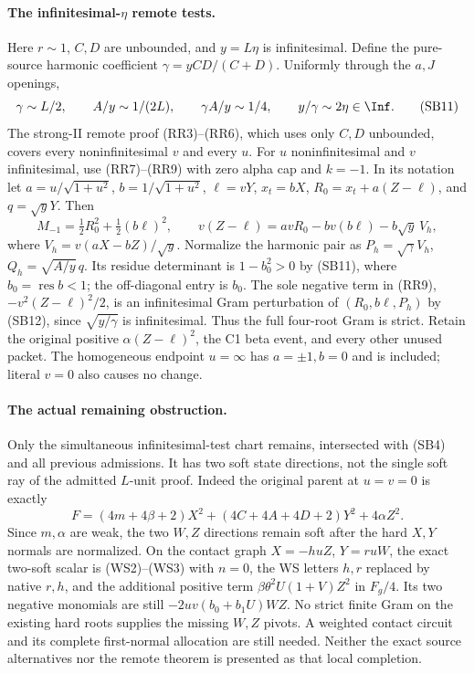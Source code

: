 \paragraph{The infinitesimal-$\eta$ remote tests.}
Here $r\sim1$, $C,D$ are unbounded, and $y=L\eta$ is infinitesimal.
Define the pure-source harmonic coefficient
$\gamma=yCD/(C+D)$. Uniformly through the $a,J$ openings,
\[
 \gamma\sim L/2,\qquad A/y\sim1/(2L),\qquad
 \gamma A/y\sim1/4,\qquad y/\gamma\sim2\eta\in\Inf. \tag{SB11}
\]
The strong-II remote proof (RR3)--(RR6), which uses only $C,D$
unbounded, covers every noninfinitesimal $v$ and every $u$.
For $u$ noninfinitesimal and $v$ infinitesimal, use (RR7)--(RR9)
with zero alpha cap and $k=-1$. In its notation let
$a=u/\sqrt{1+u^2}$, $b=1/\sqrt{1+u^2}$,
$\ell=vY$, $x_t=bX$, $R_0=x_t+a(Z-\ell)$, and $q=\sqrt yY$.
Then
\[
 M_{-1}=\tfrac12R_0^2+\tfrac12(b\ell)^2,\qquad
 v(Z-\ell)=avR_0-bv(b\ell)-b\sqrt y\,V_h,       \tag{SB12}
\]
where $V_h=v(aX-bZ)/\sqrt y$. Normalize the harmonic pair as
$P_h=\sqrt\gamma V_h$, $Q_h=\sqrt{A/y}\,q$. Its residue
determinant is $1-b_0^2>0$ by (SB11), where $b_0=\operatorname{res}b<1$;
the off-diagonal entry is $b_0$. The sole negative term in (RR9),
$-v^2(Z-\ell)^2/2$, is an infinitesimal Gram perturbation of
$(R_0,b\ell,P_h)$ by (SB12), since $\sqrt{y/\gamma}$ is
infinitesimal. Thus the full four-root Gram is strict. Retain the
original positive $\alpha(Z-\ell)^2$, the C1 beta event, and every
other unused packet. The homogeneous endpoint $u=\infty$ has
$a=\pm1,b=0$ and is included; literal $v=0$ also causes no change.

\paragraph{The actual remaining obstruction.}
Only the simultaneous infinitesimal-test chart remains, intersected
with (SB4) and all previous admissions. It has two soft state
directions, not the single soft ray of the admitted $L$-unit proof.
Indeed the original parent at $u=v=0$ is exactly
\[
 F= (4m+4\beta+2)X^2+(4C+4A+4D+2)Y^2+4\alpha Z^2. \tag{SB13}
\]
Since $m,\alpha$ are weak, the two $W,Z$ directions remain soft
after the hard $X,Y$ normals are normalized. On the contact graph
$X=-huZ$, $Y=ruW$, the exact two-soft scalar is (WS2)--(WS3)
with $n=0$, the WS letters $h,r$ replaced by native $r,h$, and
the additional positive term
$\beta\theta^2U(1+V)Z^2$ in $F_g/4$. Its two negative
monomials are still $-2uv(b_0+b_1U)WZ$. No strict finite Gram
on the existing hard roots supplies the missing $W,Z$ pivots.
A weighted contact circuit and its complete first-normal allocation
are still needed. Neither the exact source alternatives nor the
remote theorem is presented as that local completion.
